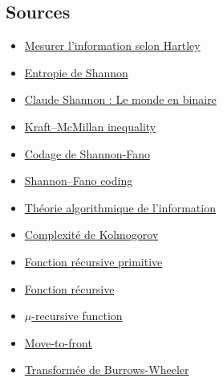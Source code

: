\documentclass[10pt,a4paper]{article}
\theoremstyle{definition}
\numberwithin{lemma}{subsection}
\numberwithin{theorem}{subsection}
\numberwithin{definition}{subsection}
\numberwithin{proposition}{subsection}
\numberwithin{corollary}{subsection}
\numberwithin{property}{subsection}
\numberwithin{example}{subsection}
\numberwithin{heuristique}{subsection}
\numberwithin{scenario}{subsection}
\begin{document}
\subsection*{Sources}
\begin{itemize}
\item \href{https://www.sciencepresse.qc.ca/blogue/2014/12/24/mesurer-linformation-selon-hartley}{Mesurer l'information selon Hartley}
\item \href{https://fr.wikipedia.org/wiki/Entropie_de_Shannon}{Entropie de Shannon}
\item \href{https://centenaire-shannon.cnrs.fr/chapter/la-theorie-de-information}{Claude Shannon : Le monde en binaire}
\item \href{https://en.wikipedia.org/wiki/Kraft\%E2\%80\%93McMillan_inequality}{Kraft–McMillan inequality}
\item \href{https://fr.wikipedia.org/wiki/Codage_de_Shannon-Fano}{Codage de Shannon-Fano}
\item \href{https://en.wikipedia.org/wiki/Shannon\%E2\%80\%93Fano_coding}{Shannon–Fano coding}
\item \href{https://fr.wikipedia.org/wiki/Th%C3%A9orie_algorithmique_de_l%27information}{Théorie algorithmique de l'information}
\item \href{https://fr.wikipedia.org/wiki/Complexit%C3%A9_de_Kolmogorov}{Complexité de Kolmogorov}
\item \href{https://fr.wikipedia.org/wiki/Fonction_r%C3%A9cursive_primitive}{Fonction récursive primitive}
\item \href{https://fr.wikipedia.org/wiki/Fonction_r%C3%A9cursive}{Fonction récursive}
\item \href{https://en.wikipedia.org/wiki/%CE%9C-recursive\_function}{$\mu$-recursive function}
\item \href{https://fr.wikipedia.org/wiki/Move-to-front}{Move-to-front}
\item \href{https://fr.wikipedia.org/wiki/Transform\%C3\%A9e_de_Burrows-Wheeler}{Transformée de Burrows-Wheeler}
\end{itemize}
\end{document}
